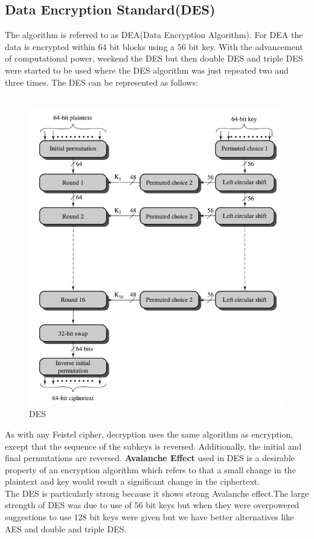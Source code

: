 \documentclass{article}
\begin{document}
\subsection{Data Encryption Standard(DES)}
The algorithm is referred to as DEA(Data Encryption Algorithm). For DEA the data is encrypted within 64 bit blocks using a 56 bit key. With the advancement of computational power, weekend the DES but then double DES and triple DES were started to be used where the DES algorithm was just repeated two and three times. The DES can be represented as follows:
\\
\\
\begin{figure}
\begin{center}
    
    \includegraphics[scale = 0.6]{images/des.png}
    \caption{DES}

\end{center}
 \end{figure}
As with any Feistel cipher, decryption uses the same algorithm as encryption, except that the sequence of the subkeys is reversed. Additionally, the initial and final permutations are reversed.
\textbf{Avalanche Effect} used in DES is a desirable property of an encryption algorithm which refers to that a small change in the plaintext and key would result a significant change in the ciphertext.\\
The DES is particularly strong because it shows strong Avalanche effect.The large strength of DES was due to use of 56 bit keys but when they were overpowered suggestions to use 128 bit keys were given but we have better alternatives like AES and double and triple DES.\\
\end{document}
